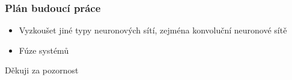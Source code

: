 \documentclass[10pt,xcolor=pdflatex]{beamer}
\begin{document}

\begin{frame}\frametitle{Plán budoucí práce}
	\begin{itemize}
		\item Vyzkoušet jiné typy neuronových sítí, zejména konvoluční neuronové sítě
		\item Fúze systémů
	\end{itemize}
	\vspace{10em}
	\begin{center}
      Děkuji za pozornost
    \end{center}
\end{frame}



\end{document}
